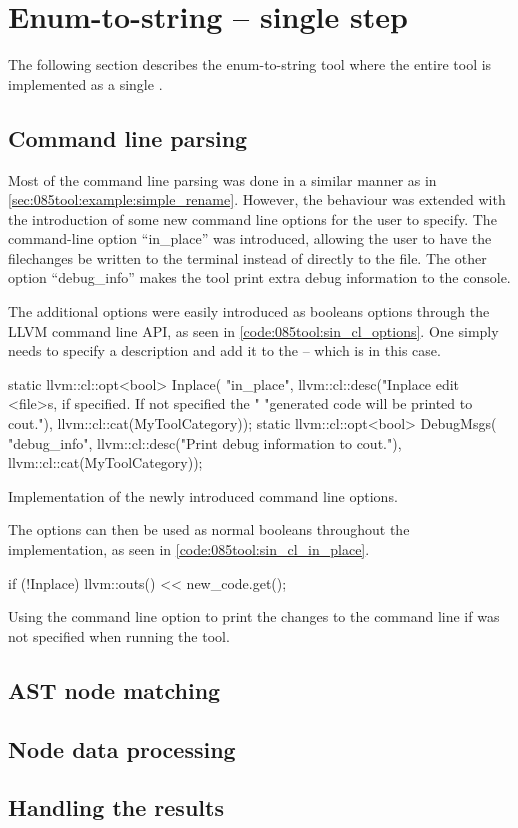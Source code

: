 \section{Enum-to-string -- single step}
The following section describes the enum-to-string tool where the entire tool is implemented as a single .

\subsection{Command line parsing}
Most of the command line parsing was done in a similar manner as in \cref{sec:085tool:example:simple_rename}. However, the behaviour was extended with the introduction of some new command line options for the user to specify.
The command-line option ``in\_place'' was introduced, allowing the user to have the filechanges be written to the terminal instead of directly to the file.
The other option ``debug\_info'' makes the tool print extra debug information to the console.

The additional options were easily introduced as booleans options through the LLVM command line API, as seen in \cref{code:085tool:sin_cl_options}. One simply needs to specify a description and add it to the  -- which is  in this case.

\begin{listing}[H]
    \begin{cppcode}
static llvm::cl::opt<bool> Inplace(
    "in_place",
    llvm::cl::desc("Inplace edit <file>s, if specified. If not specified the "
                   "generated code will be printed to cout."),
    llvm::cl::cat(MyToolCategory));
static llvm::cl::opt<bool> DebugMsgs(
    "debug_info", llvm::cl::desc("Print debug information to cout."),
    llvm::cl::cat(MyToolCategory));
    \end{cppcode}
    \caption{Implementation of the newly introduced command line options.}
    \label{code:085tool:sin_cl_options}
\end{listing}

The options can then be used as normal booleans throughout the implementation, as seen in \cref{code:085tool:sin_cl_in_place}.

\begin{listing}[H]
    \begin{cppcode}
if (!Inplace) {
    llvm::outs() << new_code.get();
}
    \end{cppcode}
    \caption{Using the  command line option to print the changes to the command line if  was not specified when running the tool.}
    \label{code:085tool:sin_cl_in_place}
\end{listing}

\subsection{AST node matching}\label{subsec:085tool:enum_node_matching_sin}

\subsection{Node data processing}

\subsection{Handling the results}
